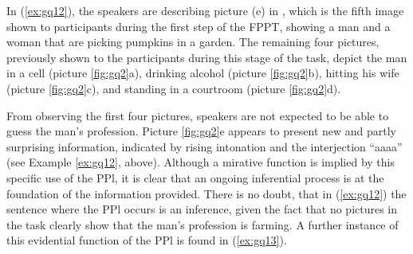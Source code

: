 \documentclass[output=paper]{langsci/langscibook}
\begin{document}
In (\ref{ex:gq12}), the speakers are describing picture (e) in , which is the fifth image shown to participants during the first step of the FPPT, showing a man and a woman that are picking pumpkins in a garden. The remaining four pictures, previously shown to the participants during this stage of the task, depict the man in a cell (picture \ref{fig:gq2}a), drinking alcohol (picture \ref{fig:gq2}b), hitting his wife (picture \ref{fig:gq2}c), and standing in a courtroom (picture \ref{fig:gq2}d).


From observing the first four pictures, speakers are not expected to be able to guess the man’s profession. Picture \ref{fig:gq2}e appears to present new and partly surprising information, indicated by rising intonation and the interjection “aaaa” (see Example \ref{ex:gq12}, above). Although a mirative function is implied by this specific use of the PPl, it is clear that an ongoing inferential process is at the foundation of the information provided. There is no doubt, that in (\ref{ex:gq12}) the sentence where the PPl occurs is an inference, given the fact that no pictures in the task clearly show that the man’s profession is farming. A further instance of this evidential function of the PPl is found in (\ref{ex:gq13}). 
\end{document}
